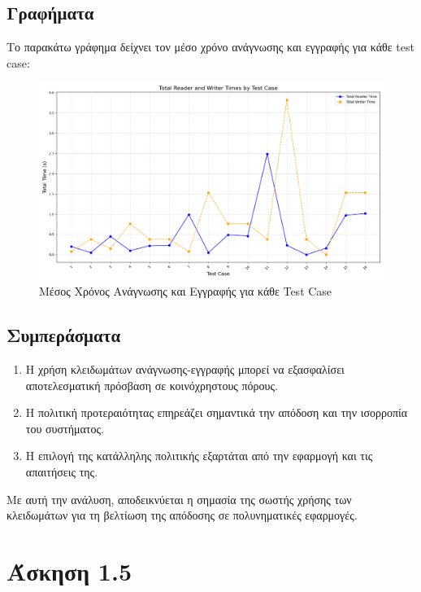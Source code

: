 \documentclass{article}
\begin{document}
\subsection*{Γραφήματα} 
Το παρακάτω γράφημα δείχνει τον μέσο χρόνο ανάγνωσης και εγγραφής για κάθε test case: 
\newpage 
\begin{figure}[h] 
    \centering \includegraphics[width=1\textwidth]{starvation_results.png} 
    \caption{Μέσος Χρόνος Ανάγνωσης και Εγγραφής για κάθε Test Case} 
\end{figure}
\subsection*{Συμπεράσματα} 
\begin{enumerate} 
    \item Η χρήση κλειδωμάτων ανάγνωσης-εγγραφής μπορεί να εξασφαλίσει αποτελεσματική πρόσβαση σε κοινόχρηστους πόρους. 
    \item Η πολιτική προτεραιότητας επηρεάζει σημαντικά την απόδοση και την ισορροπία του συστήματος. 
    \item Η επιλογή της κατάλληλης πολιτικής εξαρτάται από την εφαρμογή και τις απαιτήσεις της. 
\end{enumerate}
Με αυτή την ανάλυση, αποδεικνύεται η σημασία της σωστής χρήσης των κλειδωμάτων για τη βελτίωση της απόδοσης σε πολυνηματικές εφαρμογές.
\section*{Άσκηση 1.5}
\end{document}

